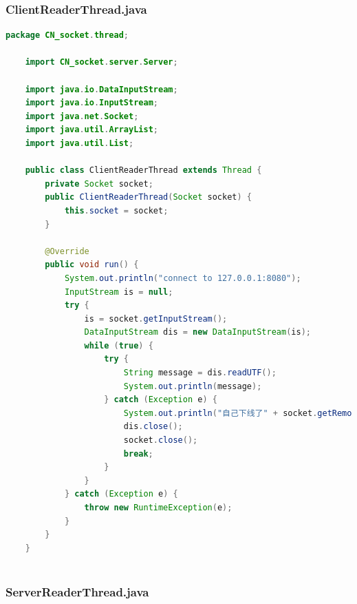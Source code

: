 \documentclass{article}
\begin{document}
	\subsubsection{ClientReaderThread.java}
	
	\begin{lstlisting}[language=Java, title=ClientReaderThread.java, tabsize=4]
	package CN_socket.thread;
	
	import CN_socket.server.Server;
	
	import java.io.DataInputStream;
	import java.io.InputStream;
	import java.net.Socket;
	import java.util.ArrayList;
	import java.util.List;
	
	public class ClientReaderThread extends Thread {
		private Socket socket;
		public ClientReaderThread(Socket socket) {
			this.socket = socket;
		}
		
		@Override
		public void run() {
			System.out.println("connect to 127.0.0.1:8080");
			InputStream is = null;
			try {
				is = socket.getInputStream();
				DataInputStream dis = new DataInputStream(is);
				while (true) {
					try {
						String message = dis.readUTF();
						System.out.println(message);
					} catch (Exception e) {
						System.out.println("自己下线了" + socket.getRemoteSocketAddress());
						dis.close();
						socket.close();
						break;
					}
				}
			} catch (Exception e) {
				throw new RuntimeException(e);
			}
		}
	}
	
	\end{lstlisting}
	
	\subsubsection{ServerReaderThread.java}
	
\end{document}
